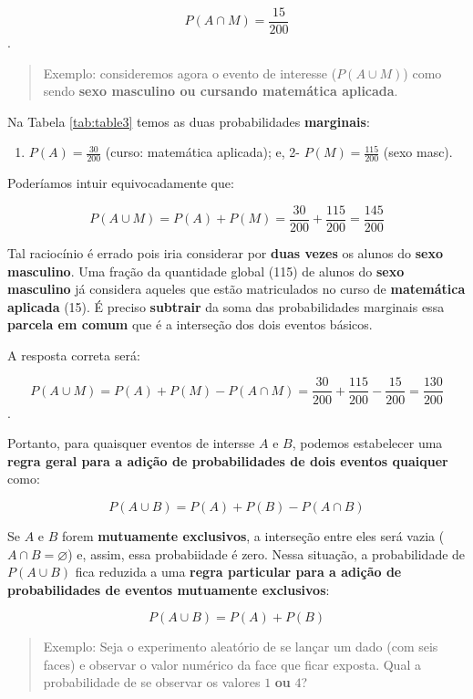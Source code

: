 \documentclass[
]{book}
\providecommand{\tightlist}{%
  \setlength{\itemsep}{0pt}\setlength{\parskip}{0pt}}
\begin{document}
\[
P(A \cap M) = \frac{15}{200}
\].

\begin{quote}
Exemplo: consideremos agora o evento de interesse (\(P(A \cup M)\)) como sendo \textbf{sexo masculino ou cursando matemática aplicada}.
\end{quote}

Na Tabela \ref{tab:table3} temos as duas probabilidades \textbf{marginais}:

\begin{enumerate}
\def\labelenumi{\arabic{enumi}.}
\tightlist
\item
  \(P(A)=\frac{30}{200}\) (curso: matemática aplicada); e,
  2- \(P(M)=\frac{115}{200}\) (sexo masc).
\end{enumerate}

Poderíamos intuir equivocadamente que:

\[
P(A \cup M) = P(A) + P(M) = \frac{30}{200} + \frac{115}{200} = \frac{145}{200}
\]

Tal raciocínio é errado pois iria considerar por \textbf{duas vezes} os alunos do \textbf{sexo masculino}. Uma fração da quantidade global (115) de alunos do \textbf{sexo masculino} já considera aqueles que estão matriculados no curso de \textbf{matemática aplicada} (15). É preciso \textbf{subtrair} da soma das probabilidades marginais essa \textbf{parcela em comum} que é a interseção dos dois eventos básicos.

A resposta correta será:

\[
P(A \cup M) = P(A) + P(M) - P(A \cap M) = \frac{30}{200} + \frac{115}{200} -\frac{15}{200} = \frac{130}{200}
\].

\hfill\break

Portanto, para quaisquer eventos de intersse \(A\) e \(B\), podemos estabelecer uma \textbf{regra geral para a adição de probabilidades de dois eventos quaiquer} como:

\[
P(A \cup B) = P(A) + P(B) - P(A \cap B)
\]

Se \(A\) e \(B\) forem \textbf{mutuamente exclusivos}, a interseção entre eles será vazia (\(A \cap B =\varnothing\)) e, assim, essa probabiidade é zero. Nessa situação, a probabilidade de \(P(A \cup B)\) fica reduzida a uma \textbf{regra particular para a adição de probabilidades de eventos mutuamente exclusivos}:

\[
P(A \cup B) = P(A) + P(B)
\]

\begin{quote}
Exemplo: Seja o experimento aleatório de se lançar um dado (com seis faces) e observar o valor numérico da face que ficar exposta. Qual a probabilidade de se observar os valores \(1\) \textbf{ou} \(4\)?
\end{quote}
\end{document}
